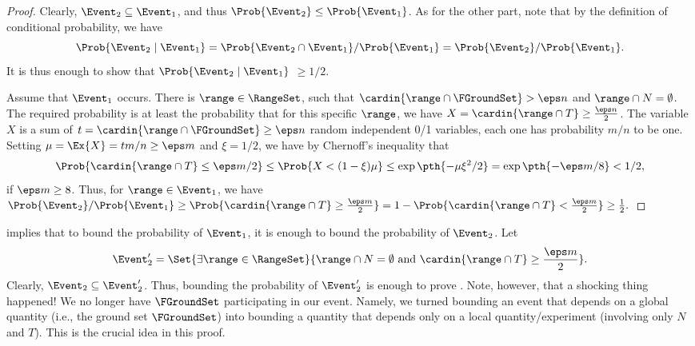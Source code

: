 \begin{proof}
    Clearly, $\Event_2 \subseteq \Event_1$, and thus $\Prob{\Event_2}
    \leq \Prob{\Event_1}$. As for the other part, note that by the
    definition of conditional probability, we have
    \[
        \Prob{ \Event_2 \mid{ \Event_1}} = \Prob{\Event_2 \cap
           \Event_1} / \Prob{\Event_1} = \Prob{\Event_2} /
        \Prob{\Event_1}.
    \]
    It is thus enough to show that $\Prob{\Event_2 \mid{\Event_1}}$
    $\geq 1/2$.
    
    Assume that $\Event_1$ occurs. There is $\range \in \RangeSet$,
    such that $\cardin{\range \cap \FGroundSet} > \eps n$ and
    $\range \cap N = \emptyset$.  The required probability is at least
    the probability that for this specific $\range$, we have
    $X = \cardin{ \range \cap T} \geq \tfrac{\eps n}{2}$. The variable
    $X$ is a sum of $t = \cardin{\range \cap \FGroundSet} \geq \eps n$
    random independent 0/1 variables, each one has probability $m/n$
    to be one. Setting $\mu = \Ex{X} = t m/n \geq \eps m$ and
    $\xi = 1/2$, we have by Chernoff's inequality that
    \begin{align*}
      \Prob{ \cardin{\range \cap T} \leq \eps m /2} %
      \leq%
      \Prob{ X  < (1-\xi) \mu }%
      \leq%
      \exp \pth{ - \mu \xi^2 / 2 }%
      =%
      \exp \pth{ - \eps m / 8 }%
      < %
      1/2,
    \end{align*}
    if $\eps m \geq 8$.  Thus, for $\range \in \Event_1$, we have
    \begin{math}
        \Prob{\Event_2} / \Prob{\Event_1} \geq \Prob{\cardin{ \range
              \cap T} \geq \tfrac{\eps m}{2}} = 1 -\Prob{
           \cardin{\range \cap T} < \frac{\eps m}{2} } \geq
        \frac{1}{2}.
    \end{math}
\end{proof}


 implies that to bound the probability of $\Event_1$,
it is enough to bound the probability of $\Event_2$.  Let
\begin{equation*}
    \Event_2'%
    =%
    \Set{ \exists{\range \in \RangeSet} }{\bigl. \range \cap
       N
       = \emptyset \text{ and }\cardin{\range \cap T} \geq
       \frac{\eps m}{2} }.
\end{equation*}
Clearly, $\Event_2 \subseteq \Event_2'$. Thus, bounding the
probability of $\Event_2'$ is enough to prove
. Note, however, that a shocking thing happened!
We no longer have $\FGroundSet$ participating in our event. Namely, we
turned bounding an event that depends on a global quantity (i.e., the
ground set $\FGroundSet$) into bounding a quantity that depends only
on a local quantity/experiment (involving only $N$ and $T$).  This is
the crucial idea in this proof.

